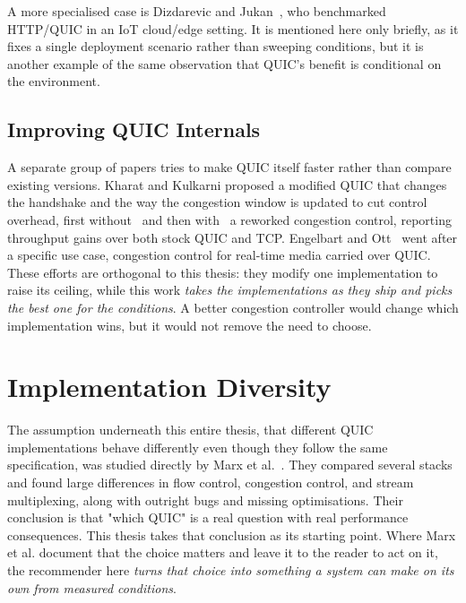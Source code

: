 A more specialised case is Dizdarevic and Jukan~\cite{dizdarevic2021benchmarking},
who benchmarked HTTP/QUIC in an IoT cloud/edge setting. It is mentioned here
only briefly, as it fixes a single deployment scenario rather than sweeping
conditions, but it is another example of the same observation that QUIC's
benefit is conditional on the environment.

\subsection{Improving QUIC Internals}
\label{subsec:rw-improving}

A separate group of papers tries to make QUIC itself faster rather than
compare existing versions. Kharat and Kulkarni proposed a modified QUIC that
changes the handshake and the way the congestion window is updated to cut
control overhead, first without~\cite{kharat2019modquic} and then
with~\cite{kharat2021modquic} a reworked congestion control, reporting
throughput gains over both stock QUIC and TCP. Engelbart and
Ott~\cite{engelbart2021rtp} went after a specific use case, congestion control
for real-time media carried over QUIC. These efforts are orthogonal to this
thesis: they modify one implementation to raise its ceiling, while this work
\emph{takes the implementations as they ship and picks the best one for the
conditions}. A better congestion controller would change which implementation
wins, but it would not remove the need to choose.

\section{Implementation Diversity}
\label{sec:rw-diversity}

The assumption underneath this entire thesis, that different QUIC
implementations behave differently even though they follow the same
specification, was studied directly by Marx et al.~\cite{marx2020same}. They
compared several stacks and found large differences in flow control,
congestion control, and stream multiplexing, along with outright bugs and
missing optimisations. Their conclusion is that "which QUIC" is a real
question with real performance consequences. This thesis takes that conclusion
as its starting point. Where Marx et al. document that the choice matters and
leave it to the reader to act on it, the recommender here \emph{turns that
choice into something a system can make on its own from measured conditions}.

